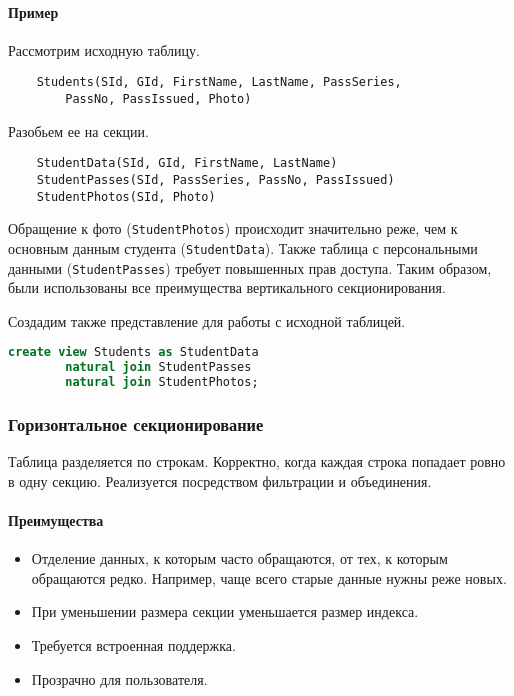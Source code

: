 \paragraph{Пример}

Рассмотрим исходную таблицу.

\begin{lstlisting}
    Students(SId, GId, FirstName, LastName, PassSeries,
        PassNo, PassIssued, Photo)
\end{lstlisting}

Разобьем ее на секции.

\begin{lstlisting}
    StudentData(SId, GId, FirstName, LastName)
    StudentPasses(SId, PassSeries, PassNo, PassIssued)
    StudentPhotos(SId, Photo)
\end{lstlisting}

Обращение к фото (\texttt{StudentPhotos}) происходит значительно реже, чем к основным данным
студента (\texttt{StudentData}). Также таблица с персональными данными (\texttt{StudentPasses})
требует повышенных прав доступа. Таким образом, были использованы все преимущества вертикального
секционирования.

Создадим также представление для работы с исходной таблицей.

\begin{lstlisting}[language=SQL]
    create view Students as StudentData
        natural join StudentPasses
        natural join StudentPhotos;
\end{lstlisting}

\subsubsection{Горизонтальное секционирование}

Таблица разделяется по строкам. Корректно, когда каждая строка попадает ровно в одну секцию.
Реализуется посредством фильтрации и объединения.

\paragraph{Преимущества}

\begin{itemize}
	\item Отделение данных, к которым часто обращаются, от тех, к которым обращаются редко. Например, чаще
	      всего старые данные нужны реже новых.
	\item При уменьшении размера секции уменьшается размер индекса.
	\item Требуется встроенная поддержка.
	\item Прозрачно для пользователя.
\end{itemize}

